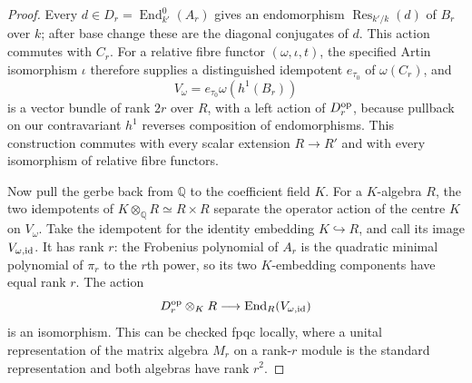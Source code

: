 \begin{proof}
Every $d\in D_r=\operatorname{End}_{k'}^0(A_r)$ gives an endomorphism
$\operatorname{Res}_{k'/k}(d)$ of $B_r$ over $k$; after base change
these are the diagonal conjugates of $d$. This action commutes with
$C_r$. For a relative fibre functor $(\omega,\iota,t)$, the specified
Artin isomorphism $\iota$ therefore supplies a distinguished
idempotent $e_{\tau_0}$ of $\omega(C_r)$, and
\[
 V_\omega=e_{\tau_0}\omega(h^1(B_r))
\]
is a vector bundle of rank $2r$ over $R$, with a left action of
$D_r^{\rm op}$, because pullback on our contravariant $h^1$ reverses
composition of endomorphisms.
This construction commutes with every scalar extension $R\to R'$
and with every isomorphism of relative fibre functors.

Now pull the gerbe back from $\mathbb Q$ to the coefficient field $K$.
For a $K$-algebra $R$, the two idempotents of
$K\otimes_{\mathbb Q}R\simeq R\times R$ separate the operator action
of the centre $K$ on $V_\omega$. Take the idempotent for the identity
embedding $K\hookrightarrow R$, and call its image $V_{\omega,{\rm id}}$.
It has rank $r$: the Frobenius polynomial of $A_r$ is the quadratic
minimal polynomial of $\pi_r$ to the $r$th power, so its two
$K$-embedding components have equal rank $r$. The action
\[
 D_r^{\rm op}\otimes_K R\longrightarrow
       \operatorname{End}_R(V_{\omega,{\rm id}})
\]
is an isomorphism. This can be checked fpqc locally, where a unital
representation of the matrix algebra $M_r$ on a rank-$r$ module is
the standard representation and both algebras have rank $r^2$.


\end{proof}
